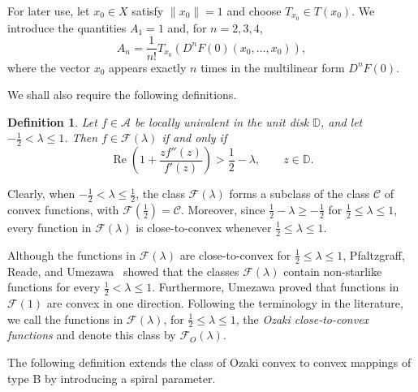 \documentclass[11pt, reqno]{amsart}
\newtheorem{defi}{Definition}[section]
\numberwithin{equation}{section}
\begin{document}
For later use, let $x_0\in X$ satisfy $\|x_0\|=1$ and choose $T_{x_0}\in T(x_0)$. We introduce the quantities $A_1=1$
and, for $n=2,3,4$,
\begin{equation}\label{eq:An}
A_n=\frac{1}{n!}T_{x_0}\left(D^nF(0)(x_0,\ldots,x_0)
\right),
\end{equation}
where the vector $x_0$ appears exactly $n$ times in the multilinear form $D^nF(0)$.



We shall also require the following definitions.

\begin{defi}
Let $f \in \mathcal{A}$ be locally univalent in the unit disk $\mathbb{D}$, and let
$-\frac{1}{2}<\lambda\leq 1$. Then $f\in \mathcal{F}(\lambda)$ if and only if
\begin{equation}\label{eq:Flambda}
\operatorname{Re}\left(1+\frac{zf''(z)}{f'(z)}\right)
>
\frac{1}{2}-\lambda,
\qquad z\in\mathbb{D}.
\end{equation}
\end{defi}

Clearly, when $-\frac{1}{2}<\lambda\leq\frac{1}{2}$, the class $\mathcal{F}(\lambda)$ forms a subclass of the class $\mathcal{C}$ of convex
functions, with $\mathcal{F}\!\left(\frac{1}{2}\right)=\mathcal{C}.$
Moreover, since $\frac{1}{2}-\lambda\geq-\frac{1}{2}$ for $\frac{1}{2}\leq\lambda\leq 1$, every function in $\mathcal{F}(\lambda)$ is close-to-convex whenever $\frac{1}{2}\leq\lambda\leq 1$.

Although the functions in $\mathcal{F}(\lambda)$ are close-to-convex for $\frac12\leq\lambda\leq1$, Pfaltzgraff, Reade, and Umezawa~\cite{Pfaltzgraff1976} showed that the classes $\mathcal{F}(\lambda)$ contain non-starlike functions for every $\frac{1}{2}<\lambda\leq 1$. Furthermore, Umezawa \cite{Umezawa1952} proved that functions in $\mathcal{F}(1)$ are convex in one direction. Following the terminology in the literature, we call the functions in $\mathcal{F}(\lambda)$, for $\frac{1}{2}\leq\lambda\leq1$, the
\emph{Ozaki close-to-convex functions} and denote this class by
$\mathcal{F}_{O}(\lambda)$. \par


\medskip
The following definition extends the class of Ozaki convex to convex mappings of type B by introducing a spiral parameter.
\end{document}
